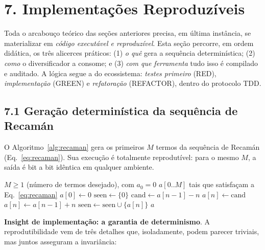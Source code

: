 
\section*{7. Implementações Reproduzíveis}

 Toda o arcabouço teórico das seções anteriores precisa, em última
instância, se materializar em \emph{código executável e reproduzível}. Esta seção
percorre, em ordem didática, os três alicerces práticos: (1) \emph{o quê} gera a
sequência determinística; (2) \emph{como} o diversificador a consome; e (3)
\emph{com que ferramenta} tudo isso é compilado e auditado. A lógica segue a do
ecossistema: \emph{testes primeiro} (RED), \emph{implementação} (GREEN) e
\emph{refatoração} (REFACTOR), dentro do protocolo TDD.

\subsection*{7.1 Geração determinística da sequência de Recamán}

 O Algoritmo~\ref{alg:recaman} gera os primeiros $M$ termos da sequência
de Recamán (Eq.~\ref{eq:recaman}). Sua execução é totalmente reprodutível: para o
mesmo $M$, a saída é bit a bit idêntica em qualquer ambiente.

\begin{algorithm}[!htb]
\caption{Geração determinística da sequência de Recamán}
\label{alg:recaman}
\begin{algorithmic}[1]
\Require $M \geq 1$ (número de termos desejado), com $a_0 = 0$
\Ensure $a[0..M]$ tais que satisfaçam a Eq.~\ref{eq:recaman}
\State $a[0] \gets 0$
\State $\text{seen} \gets \{0\}$
  \State $\text{cand} \gets a[n-1] - n$
    \State $a[n] \gets \text{cand}$
  \Else
    \State $a[n] \gets a[n-1] + n$
  \EndIf
  \State $\text{seen} \gets \text{seen} \cup \{a[n]\}$
\EndFor
\State \Return $a$
\end{algorithmic}
\end{algorithm}

 \textbf{Insight de implementação: a garantia de determinismo}. A
reprodutibilidade vem de três detalhes que, isoladamente, podem parecer triviais,
mas juntos asseguram a invariância:


